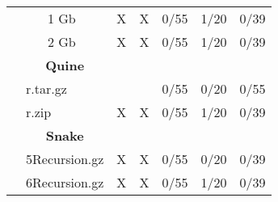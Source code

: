 \documentclass{article}           %
\begin{document}
\begin{table}[]
\begin{tabular}{lllccccc}
\multicolumn{1}{|l|}{}                               & \multicolumn{1}{l|}{}                     & \multicolumn{1}{l|}{1 Gb}   & \multicolumn{1}{c|}{\textsf{X}}       & \multicolumn{1}{c|}{\textsf{X}}       & \multicolumn{1}{c|}{0/55}           & \multicolumn{1}{c|}{1/20}      & \multicolumn{1}{c|}{0/39}        \\ \cline{3-8} 
\multicolumn{1}{|l|}{}                               & \multicolumn{1}{l|}{}                     & \multicolumn{1}{l|}{2 Gb}   & \multicolumn{1}{c|}{\textsf{X}}       & \multicolumn{1}{c|}{\textsf{X}}       & \multicolumn{1}{c|}{0/55}           & \multicolumn{1}{c|}{1/20}      & \multicolumn{1}{c|}{0/39}        \\ \cline{2-8} 
\multicolumn{1}{|l|}{}                               & \multicolumn{2}{c|}{\textbf{Quine}}                                     & \multicolumn{5}{c|}{}                                                                                                                                   \\ \cline{2-8} 
\multicolumn{1}{|l|}{}                               & \multicolumn{2}{l|}{r.tar.gz}                                               & \multicolumn{1}{c|}{}       & \multicolumn{1}{c|}{}       & \multicolumn{1}{c|}{0/55}           & \multicolumn{1}{c|}{0/20}      & \multicolumn{1}{c|}{0/55}        \\ \cline{2-8} 
\multicolumn{1}{|l|}{}                               & \multicolumn{2}{l|}{r.zip}                                              & \multicolumn{1}{c|}{\textsf{X}}       & \multicolumn{1}{c|}{\textsf{X}}       & \multicolumn{1}{c|}{0/55}           & \multicolumn{1}{c|}{1/20}      & \multicolumn{1}{c|}{0/39}        \\ \cline{2-8} 
\multicolumn{1}{|l|}{}                               & \multicolumn{2}{c|}{\textbf{Snake}}                                     & \multicolumn{5}{c|}{}                                                                                                                                   \\ \cline{2-8} 
\multicolumn{1}{|l|}{}                               & \multicolumn{2}{l|}{5Recursion.gz}                                      & \multicolumn{1}{c|}{\textsf{X}}       & \multicolumn{1}{c|}{\textsf{X}}       & \multicolumn{1}{c|}{0/55}           & \multicolumn{1}{c|}{0/20}      & \multicolumn{1}{c|}{0/39}        \\ \cline{2-8} 
\multicolumn{1}{|l|}{}                               & \multicolumn{2}{l|}{6Recursion.gz}                                      & \multicolumn{1}{c|}{\textsf{X}}	& \multicolumn{1}{c|}{\textsf{X}}	& \multicolumn{1}{c|}{0/55}	& \multicolumn{1}{c|}{1/20} & \multicolumn{1}{c|}{0/39}                                                                                                                                   \\ \cline{2-8} 

\end{tabular}
\end{table}
\end{document}
